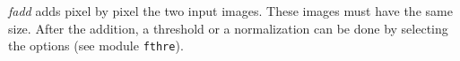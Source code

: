 {\em fadd} adds pixel by pixel the two input images. 
These images must have the same size.
After the addition, a threshold or a normalization can be done
by selecting the options (see module \verb+fthre+).
